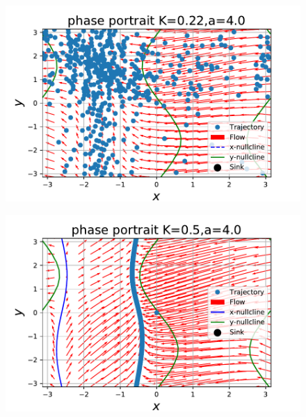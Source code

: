 \documentclass[../main]{subfiles}
\begin{document}
\begin{figure}[t]
\begin{minipage}[b]{0.47\linewidth}
      \label{fig:phase-k10}
    \end{minipage}\\
    \begin{minipage}[b]{0.47\linewidth}
      \centering
      \includegraphics[keepaspectratio, scale=0.42]{images/phase_a4K22.pdf}
      \label{fig:phase-k22}
    \end{minipage}
    \begin{minipage}[b]{0.47\linewidth}
      \centering
      \includegraphics[keepaspectratio, scale=0.42]{images/phase_a4K50.pdf}
      \label{fig:phase-k50}
    \end{minipage}\\

\end{figure}
\end{document}
